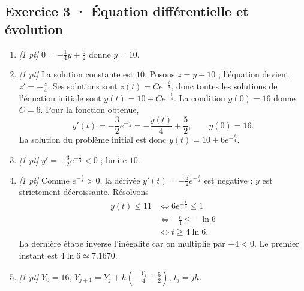 \subsection*{Exercice 3 · Équation différentielle et évolution}\begin{enumerate}

\item \textit{[1 pt]} $0=-\frac{1}{4}y+\frac{5}{2}$ donne $y=10$.

\item \textit{[1 pt]} La solution constante est $10$. Posons $z=y-10$ ; l'équation devient $z'=-\frac{z}{4}$. Ses solutions sont $z(t)=Ce^{-\frac{t}{4}}$, donc toutes les solutions de l'équation initiale sont $y(t)=10+Ce^{-\frac{t}{4}}$.
La condition $y(0)=16$ donne $C=6$. Pour la fonction obtenue,
\[y'(t)=-\frac{3}{2}e^{-\frac{t}{4}}=-\frac{y(t)}{4}+\frac{5}{2},\qquad y(0)=16.\]
La solution du problème initial est donc $y(t)=10+6e^{-\frac{t}{4}}$.

\item \textit{[1 pt]} $y'=-\frac{3}{2}e^{-\frac{t}{4}}<0$ ; limite $10$.

\item \textit{[1 pt]} Comme $e^{-\frac{t}{4}}>0$, la dérivée $y'(t)=-\frac{3}{2}e^{-\frac{t}{4}}$ est négative : $y$ est strictement décroissante. Résolvons
\[\begin{aligned}y(t)\le 11&\Longleftrightarrow 6e^{-\frac{t}{4}}\le1\\&\Longleftrightarrow -\frac{t}{4}\le-\ln 6\\&\Longleftrightarrow t\ge 4\ln 6.\end{aligned}\]
La dernière étape inverse l'inégalité car on multiplie par $-4<0$. Le premier instant est $4\ln 6\simeq\num{7,1670}$.

\item \textit{[1 pt]} $Y_0=16$, $Y_{j+1}=Y_j+h(-\frac{Y_j}{4}+\frac{5}{2})$, $t_j=jh$.

\end{enumerate}


